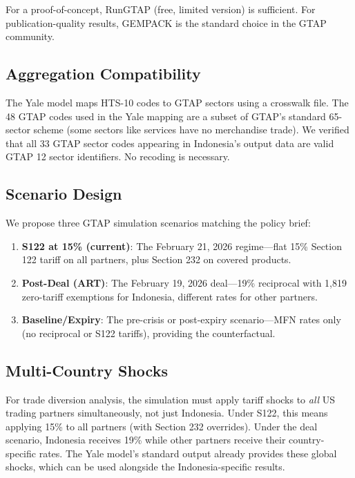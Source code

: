\documentclass[12pt,a4paper]{article}
\begin{document}
\noindent For a proof-of-concept, RunGTAP (free, limited version) is sufficient. For publication-quality results, GEMPACK is the standard choice in the GTAP community.

\subsection{Aggregation Compatibility}

The Yale model maps HTS-10 codes to GTAP sectors using a crosswalk file. The 48 GTAP codes used in the Yale mapping are a subset of GTAP's standard 65-sector scheme (some sectors like services have no merchandise trade). We verified that all 33 GTAP sector codes appearing in Indonesia's output data are valid GTAP 12 sector identifiers. No recoding is necessary.

\subsection{Scenario Design}

We propose three GTAP simulation scenarios matching the policy brief:

\begin{enumerate}
    \item \textbf{S122 at 15\% (current)}: The February 21, 2026 regime---flat 15\% Section 122 tariff on all partners, plus Section 232 on covered products.
    \item \textbf{Post-Deal (ART)}: The February 19, 2026 deal---19\% reciprocal with 1,819 zero-tariff exemptions for Indonesia, different rates for other partners.
    \item \textbf{Baseline/Expiry}: The pre-crisis or post-expiry scenario---MFN rates only (no reciprocal or S122 tariffs), providing the counterfactual.
\end{enumerate}

\subsection{Multi-Country Shocks}

For trade diversion analysis, the simulation must apply tariff shocks to \textit{all} US trading partners simultaneously, not just Indonesia. Under S122, this means applying 15\% to all partners (with Section 232 overrides). Under the deal scenario, Indonesia receives 19\% while other partners receive their country-specific rates. The Yale model's standard output already provides these global shocks, which can be used alongside the Indonesia-specific results.
\end{document}

